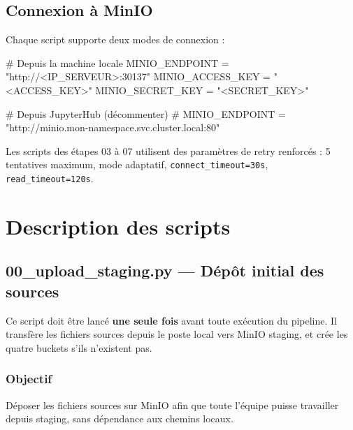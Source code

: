 \documentclass[12pt,a4paper,french]{report}
\begin{document}
\section{Connexion à MinIO}

Chaque script supporte deux modes de connexion :

\begin{codebox}
# Depuis la machine locale
MINIO\_ENDPOINT   = "http://<IP_SERVEUR>:30137"
MINIO\_ACCESS\_KEY = "<ACCESS_KEY>"
MINIO\_SECRET\_KEY = "<SECRET_KEY>"

# Depuis JupyterHub (décommenter)
# MINIO\_ENDPOINT = "http://minio.mon-namespace.svc.cluster.local:80"
\end{codebox}

Les scripts des étapes 03 à 07 utilisent des paramètres de retry renforcés :
5 tentatives maximum, mode adaptatif, \texttt{connect\_timeout=30s},
\texttt{read\_timeout=120s}.

\chapter{Description des scripts}

\section{00\_upload\_staging.py — Dépôt initial des sources}

\begin{warningbox}
  Ce script doit être lancé \textbf{une seule fois} avant toute exécution du
  pipeline. Il transfère les fichiers sources depuis le poste local vers
  MinIO staging, et crée les quatre buckets s'ils n'existent pas.
\end{warningbox}

\subsection{Objectif}

Déposer les fichiers sources sur MinIO afin que toute l'équipe puisse
travailler depuis staging, sans dépendance aux chemins locaux.
\end{document}
